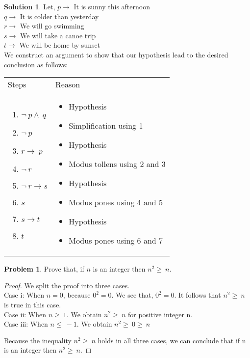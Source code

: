 \documentclass[12pt,oneside,a4paper]{book}
\theoremstyle{remark}
\theoremstyle{definition}
\newtheorem{prob}{Problem}[section]
\newtheorem*{soln}{Solution}
\begin{document}
\begin{soln}
    Let,\newline
    \(p\to\) It is sunny this afternoon\\
    \(q\to\) It is colder than yesterday\\
    \(r\to\) We will go swimming\\
    \(s\to\) We will take a canoe trip\\
    \(t\to\) We will be home by sunset\\

    We construct an argument to show that our hypothesis lead to the desired conclusion as follows:\\
    \begin{tabular}{p{} p{}}
        \qquad Steps & \qquad Reason              \\
        {
        \begin{enumerate}
            \item \(\neg\ p\wedge\ q\)
            \item \(\neg\ p\)
            \item \(r\to\ p\)
            \item \(\neg\ r\)
            \item \(\neg\ r\to s\)
            \item \(s\)
            \item \(s\to t\)
            \item \(t\)
        \end{enumerate}
        }            & \begin{itemize}
            \item [] Hypothesis
            \item [] Simplification using 1
            \item [] Hypothesis
            \item [] Modus tollens using 2 and 3
            \item [] Hypothesis
            \item [] Modus pones using 4 and 5
            \item [] Hypothesis
            \item [] Modus pones using 6 and 7
        \end{itemize} \\
    \end{tabular}
\end{soln}
\begin{prob}
    Prove that, if $ n $ is an integer then \(n^2\geq\ n\).
\end{prob}
\begin{proof}
    We split the proof into three cases.\\
    Case i: When \(n=0\), because \(0^2=0\). We see that, \(0^2=0\).
    It follows that \(n^2\geq\ n\) is true in this case.\\
    Case ii: When \(n\geq\ 1\). We obtain \(n^2\geq\ n\) for positive integer n.\\
    Case iii: When \(n\leq\ -1\). We obtain \(n^2\geq\ 0\geq\ n\)

    Because the inequality \(n^2\geq\ n\) holds in all three cases, we can conclude that if n is an integer then \(n^2\geq\ n\).
\end{proof}
\end{document}

